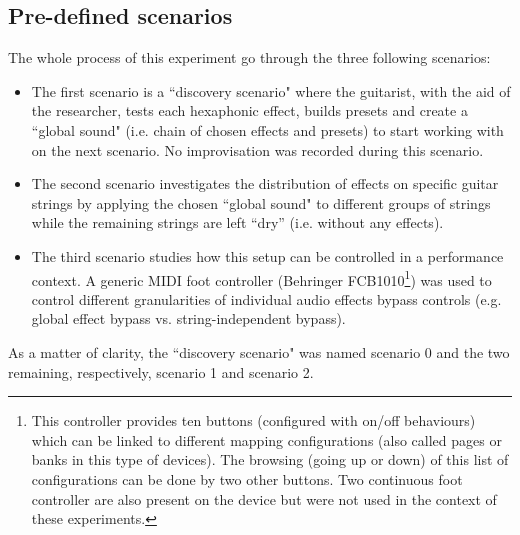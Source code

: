\documentclass{article}
\begin{document}
\subsection{Pre-defined scenarios}
The whole process of this experiment go through the three following scenarios:
\begin{itemize}
    \item The first scenario is a ``discovery scenario" where the guitarist, with the aid of the researcher, tests each hexaphonic effect, builds presets and create a ``global sound" (i.e. chain of chosen effects and presets) to start working with on the next scenario. No improvisation was recorded during this scenario.  
    
    \item The second scenario investigates the distribution of effects on specific guitar strings by applying the chosen ``global sound" to different groups of strings while the remaining strings are left ``dry'' (i.e. without any effects).
    
    \item The third scenario studies how this setup can be controlled in a performance context. A generic MIDI foot controller (Behringer FCB1010\footnote{\label{foot:Behringer1010}This controller provides ten buttons (configured with on/off behaviours) which can be linked to different mapping configurations (also called pages or banks in this type of devices). The browsing (going up or down) of this list of configurations can be done by two other buttons. Two continuous foot controller are also present on the device but were not used in the context of these experiments.}) was used to control different granularities of individual audio effects bypass controls (e.g. global effect bypass vs. string-independent bypass). 
\end{itemize} 

As a matter of clarity, the ``discovery scenario" was named scenario 0 and the two remaining, respectively, scenario 1 and scenario 2.
\end{document}

